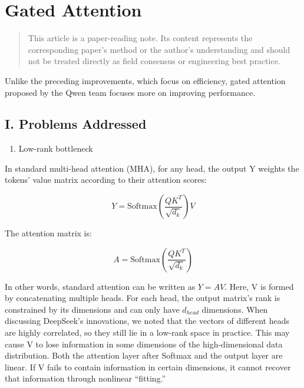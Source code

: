 \setcounter{section}{9}

\hypertarget{gated-attention}{%
\section{Gated Attention}\label{gated-attention}}

\begin{quote}
This article is a paper-reading note. Its content represents the corresponding paper's method or the author's understanding and should not be treated directly as field consensus or engineering best practice.
\end{quote}

Unlike the preceding improvements, which focus on efficiency, gated attention proposed by the Qwen team focuses more on improving performance.

\hypertarget{i.-problems-addressed}{%
\subsection{I. Problems Addressed}\label{i.-problems-addressed}}

\begin{enumerate}
\def\labelenumi{\arabic{enumi}.}
\tightlist
\item
  Low-rank bottleneck
\end{enumerate}

In standard multi-head attention (MHA), for any head, the output Y weights the tokens' value matrix according to their attention scores:

\[
Y=\mathrm{Softmax}\left(\frac{QK^T}{\sqrt{d_k}}\right)V
\]

The attention matrix is:

\[
A=\mathrm{Softmax}\left(\frac{QK^T}{\sqrt{d_k}}\right)
\]

In other words, standard attention can be written as \(Y=AV\). Here, V is formed by concatenating multiple heads. For each head, the output matrix's rank is constrained by its dimensions and can only have \(d_{head}\) dimensions. When discussing DeepSeek's innovations, we noted that the vectors of different heads are highly correlated, so they still lie in a low-rank space in practice. This may cause V to lose information in some dimensions of the high-dimensional data distribution. Both the attention layer after Softmax and the output layer are linear. If V fails to contain information in certain dimensions, it cannot recover that information through nonlinear ``fitting.''

